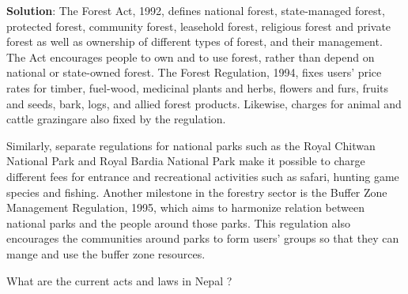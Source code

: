 \documentclass[
  openany]{book}
\newcommand{\question}{\item}
\newenvironment{solution}{ {\bfseries Solution}:}{}
\begin{document}
\begin{questions}
\begin{solution}
The Forest Act, 1992, defines national forest, state-managed forest, protected forest, community forest, leasehold forest, religious forest and private forest as well as ownership of different types of forest, and their management. The Act encourages people to own and to use forest, rather than depend on national or state-owned forest. The Forest Regulation, 1994, fixes users' price rates for timber, fuel-wood, medicinal plants and herbs, flowers and furs, fruits and seeds, bark, logs, and allied forest products. Likewise, charges for animal and cattle grazingare also fixed by the regulation.

Similarly, separate regulations for national parks such as the Royal Chitwan National Park and Royal Bardia National Park make it possible to charge different fees for entrance and recreational activities such as safari, hunting game species and fishing. Another milestone in the forestry sector is the Buffer Zone Management Regulation, 1995, which aims to harmonize relation between national parks and the people around those parks. This regulation also encourages the communities around parks to form users' groups so that they can mange and use the buffer zone resources.

\end{solution}

\question What are the current acts and laws in Nepal ?


\end{questions}
\end{document}
